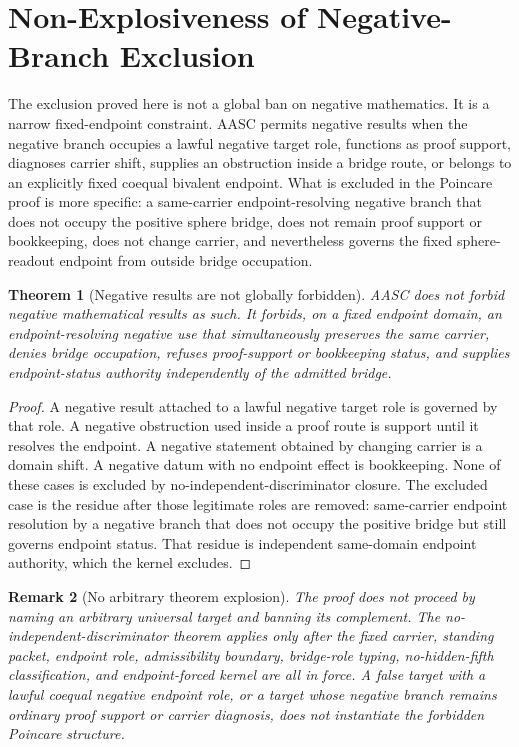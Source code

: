 \documentclass[11pt]{article}
\newtheorem{theorem}{Theorem}[section]
\newtheorem{remark}[theorem]{Remark}
\begin{document}
\section{Non-Explosiveness of Negative-Branch Exclusion}\label{sec:non-explosiveness}

The exclusion proved here is not a global ban on negative mathematics. It is a narrow fixed-endpoint constraint. AASC permits negative results when the negative branch occupies a lawful negative target role, functions as proof support, diagnoses carrier shift, supplies an obstruction inside a bridge route, or belongs to an explicitly fixed coequal bivalent endpoint. What is excluded in the Poincare proof is more specific: a same-carrier endpoint-resolving negative branch that does not occupy the positive sphere bridge, does not remain proof support or bookkeeping, does not change carrier, and nevertheless governs the fixed sphere-readout endpoint from outside bridge occupation.

\begin{theorem}[Negative results are not globally forbidden]\label{thm:negative-not-globally-forbidden}
AASC does not forbid negative mathematical results as such. It forbids, on a fixed endpoint domain, an endpoint-resolving negative use that simultaneously preserves the same carrier, denies bridge occupation, refuses proof-support or bookkeeping status, and supplies endpoint-status authority independently of the admitted bridge.
\end{theorem}
\begin{proof}
A negative result attached to a lawful negative target role is governed by that role. A negative obstruction used inside a proof route is support until it resolves the endpoint. A negative statement obtained by changing carrier is a domain shift. A negative datum with no endpoint effect is bookkeeping. None of these cases is excluded by no-independent-discriminator closure. The excluded case is the residue after those legitimate roles are removed: same-carrier endpoint resolution by a negative branch that does not occupy the positive bridge but still governs endpoint status. That residue is independent same-domain endpoint authority, which the kernel excludes.
\end{proof}

\begin{remark}[No arbitrary theorem explosion]\label{rem:no-explosion}
The proof does not proceed by naming an arbitrary universal target and banning its complement. The no-independent-discriminator theorem applies only after the fixed carrier, standing packet, endpoint role, admissibility boundary, bridge-role typing, no-hidden-fifth classification, and endpoint-forced kernel are all in force. A false target with a lawful coequal negative endpoint role, or a target whose negative branch remains ordinary proof support or carrier diagnosis, does not instantiate the forbidden Poincare structure.
\end{remark}
\end{document}
